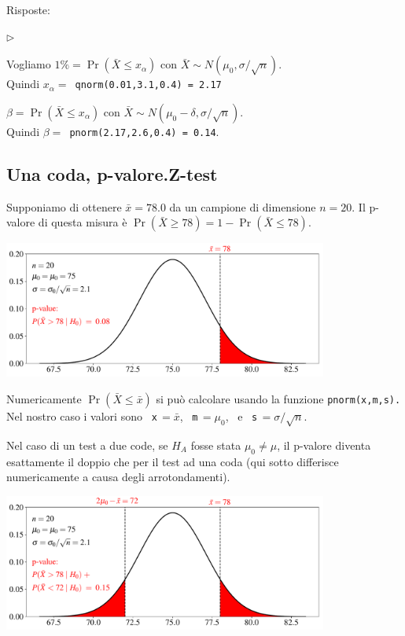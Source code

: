 \documentclass[12pt,openany]{book}
\newcommand{\mylabel}[1]{{\footnotesize\textsf{#1}}\hfill}
\renewenvironment{itemize}
  {\begin{list}{$\triangleright$}{%
   \setlength{\parskip}{0mm}
   \setlength{\topsep}{.2\baselineskip}
   \setlength{\rightmargin}{0mm}
   \setlength{\listparindent}{0mm}
   \setlength{\itemindent}{0mm}
   \setlength{\labelwidth}{3ex}
   \setlength{\itemsep}{.4\baselineskip}
   \setlength{\parsep}{0mm}
   \setlength{\partopsep}{0mm}
   \setlength{\labelsep}{1ex}
   \setlength{\leftmargin}{\labelwidth+\labelsep}
   \let\makelabel\mylabel}}{%
   \end{list}\vspace*{-1.3mm}}
\theoremstyle{mio}
\theoremstyle{liscio}
\begin{document}
Risposte:

\begin{itemize}
\item[1] Vogliamo $1\%=\Pr(\bar X\le x_\alpha)$ con $\bar X\sim N(\mu_0,\sigma/\sqrt{n})$.\\
Quindi $x_\alpha=${\tt\ qnorm(0.01,3.1,0.4)\,=\,2.17}
\item[2] $\beta=\Pr(\bar X\le x_\alpha)$ con $\bar X\sim N(\mu_0-\delta,\sigma/\sqrt{n})$. \\
Quindi  $\beta=${\tt\ pnorm(2.17,2.6,0.4)\,=\,0.14}.

\end{itemize}



\hfill{}\clearpage\subsection{Una coda, p-valore.\hfill Z-test}


Supponiamo di ottenere $\bar x=78.0$ da un campione di dimensione $n=20$. Il p-valore di questa misura è $\Pr(\bar X\ge 78)=1-\Pr(\bar X\le 78)$.

\hfil\includegraphics[width=0.8\textwidth]{figure/Z-test-p-val_01.pdf}

Numericamente $\Pr(\bar X\le \bar x)$ si può calcolare usando la funzione {\tt pnorm(x,m,s).} Nel nostro caso i valori sono \ {\tt x}$\,=\bar x$,  \ {\tt m}$\,=\mu_0$, \ e  \ {\tt s}$\,=\sigma/\sqrt{n}$.

Nel caso di un test a due code, se $H_A$ fosse stata $\mu_0\neq\mu$, il p-valore diventa esattamente il doppio che per il test ad una coda (qui sotto differisce numericamente a causa degli arrotondamenti). 

\hfil\includegraphics[width=0.8\textwidth]{figure/Z-test-p-val_02.pdf}
\end{document}
